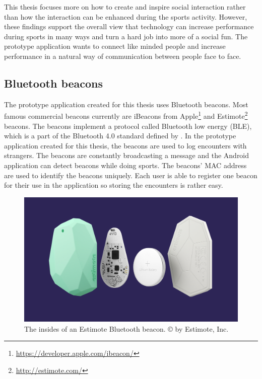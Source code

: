 This thesis focuses more on how to create and inspire social interaction rather than how the interaction can be enhanced during the sports activity. However, these findings support the overall view that technology can increase performance during sports in many ways and turn a hard job into more of a social fun. The prototype application wants to connect like minded people and increase performance in a natural way of communication between people face to face. 

\subsection{Bluetooth beacons}


The prototype application created for this thesis uses Bluetooth beacons. Most famous commercial beacons currently are iBeacons from Apple\footnote{\url{https://developer.apple.com/ibeacon/}} and Estimote\footnote{\url{http://estimote.com/}} beacons. The beacons implement a protocol called Bluetooth low energy (BLE), which is a part of the Bluetooth 4.0 standard defined by \cite{bluetooth}. In the prototype application created for this thesis, the beacons are used to log encounters with strangers. The beacons are constantly broadcasting a message and the Android application can detect beacons while doing sports. The beacons' MAC address are used to identify the beacons uniquely. Each user is able to register one beacon for their use in the application so storing the encounters is rather easy.

\begin{figure}[htb]
	\begin{center}
		\includegraphics[width=1\textwidth]{estimote_beacons.jpg}
		\caption{The insides of an Estimote Bluetooth beacon. © by Estimote, Inc.}
	\end{center}
\end{figure}

